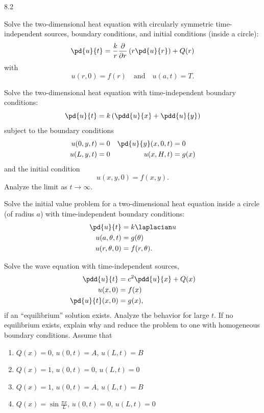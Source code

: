 \begin{exercises}{8.2}
\item Solve the two-dimensional heat equation with circularly symmetric time-independent sources, boundary conditions, and initial conditions (inside a circle):
\[
\pd{u}{t} = \frac{k}{r}\frac{\partial}{\partial r}\left(r\pd{u}{r}\right) + Q(r)
\]
with
\[
u(r,0) = f(r) \quad\text{and}\quad u(a,t) = T.
\]

\item Solve the two-dimensional heat equation with time-independent boundary conditions:
\[
\pd{u}{t} = k\left(\pdd{u}{x} + \pdd{u}{y}\right)
\]
subject to the boundary conditions
\begin{align*}
u(0,y,t) &= 0 & \pd{u}{y}(x,0,t) &= 0 \\
u(L,y,t) &= 0 & u(x,H,t) &= g(x)
\end{align*}
and the initial condition
\[
u(x,y,0) = f(x,y).
\]
Analyze the limit as $t\to\infty$.

\item Solve the initial value problem for a two-dimensional heat equation inside a circle (of radius $a$) with time-independent boundary conditions:
\begin{align*}
\pd{u}{t} &= k\laplacian u \\
u(a,\theta,t) &= g(\theta) \\
u(r,\theta,0) &= f(r,\theta).
\end{align*}

\item Solve the wave equation with time-independent sources,
\begin{align*}
\pdd{u}{t} &= c^2\pdd{u}{x} + Q(x) \\
u(x,0) &= f(x) \\
\pd{u}{t}(x,0) &= g(x),
\end{align*}
if an ``equilibrium'' solution exists.  Analyze the behavior for large $t$.  If no equilibrium exists, explain why and reduce the problem to one with homogeneous boundary conditions.  Assume that
\begin{enumerate}
\item[\starred(a)] $Q(x) = 0$, \quad $u(0,t) = A$, \quad $u(L,t) = B$
\item[(b)] $Q(x) = 1$, \quad $u(0,t) = 0$, \quad $u(L,t) = 0$
\item[(c)] $Q(x) = 1$, \quad $u(0,t) = A$, \quad $u(L,t) = B$
\par[\textit{Hint:} Add problems (a) and (b).]
\item[\starred(d)] $Q(x) = \sin\frac{\pi x}{L}$, \quad $u(0,t) = 0$, \quad $u(L,t) = 0$
\end{enumerate}

\end{exercises}
